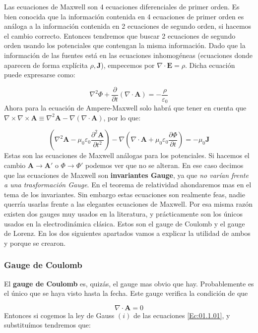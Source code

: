 \documentclass[12pt,a4paper]{article}
\newcommand{\parentesis}[1]{\left( #1  \right)}
\newcommand{\parciales}[2]{\frac{\partial #1}{\partial #2}}
\newcommand{\rota}{\nabla \times}
\newcommand{\dive}{\nabla \cdot}
\newcommand{\En}{\mathbf{E}}
\newcommand{\Jn}{\mathbf{J}}
\newcommand{\An}{\mathbf{A}}
\numberwithin{equation}{section}
\numberwithin{figure}{section}
\begin{document}
Las ecuaciones de Maxwell son 4 ecuaciones diferenciales de primer orden. Es bien conocida que la información contenida en 4 ecuaciones de primer orden es análoga a la información contenida en 2 ecuaciones de segundo orden, si hacemos el cambio correcto. Entonces tendremos que buscar 2 ecuaciones de segundo orden usando los potenciales que contengan la misma información. Dado que la información de las fuentes está en las ecuaciones inhomogéneas (ecuaciones donde aparecen de forma explícita $\rho,\Jn$), empecemos por $\dive \En = \rho$. Dicha ecuación puede expresarse como:

\begin{equation}
\nabla^2 \Phi + \parciales{}{t} ( \dive \An ) = - \dfrac{\rho}{\varepsilon_0}\label{Ec:01.3.09}
\end{equation}
Ahora para la ecuación de Ampere-Maxwell solo habrá que tener en cuenta que $\rota \rota \An \equiv \nabla^2 \An - \nabla (\nabla \cdot \An)$, por lo que:

\begin{equation}
\parentesis{\nabla^2 \An  - \mu_0 \varepsilon_0 \parciales{^2\An}{t^2}} - \nabla \parentesis{\dive \An + \mu_0 \varepsilon_0 \parciales{\Phi}{t}} = - \mu_0 \Jn\label{Ec:01.3.10}
\end{equation}
Estas son las ecuaciones de Maxwell análogas para los potenciales. Si hacemos el cambio $\An \rightarrow \An'$ o $\Phi \rightarrow \Phi'$ podemos ver que no se alteran. En ese caso decimos que las ecuaciones de Maxwell son  \textbf{invariantes Gauge}, ya que \textit{no varían frente a una trasformación Gauge}. En el teorema de relatividad ahondaremos mas en el tema de los invariantes. Sin embargo estas ecuaciones son realmente feas, nadie querría usarlas frente a las elegantes ecuaciones de Maxwell. Por esa misma razón existen dos gauges muy usados en la literatura, y prácticamente son los únicos usados en la electrodinámica clásica. Estos son el gauge de Coulomb y el gauge de Lorenz. En los dos siguientes apartados vamos a explicar la utilidad de ambos y porque se crearon.

\subsubsection{Gauge de Coulomb}

El \textbf{gauge de Coulomb} es, quizás, el gauge mas obvio que hay. Probablemente es el único que se haya visto hasta la fecha. Este gauge verifica la condición de que

\begin{equation} 
\dive \An = 0
\end{equation}
Entonces si cogemos la ley de Gauss $(i)$ de las ecuaciones \ref{Ec:01.1.01}, y substituímos tendremos que:
\end{document}
